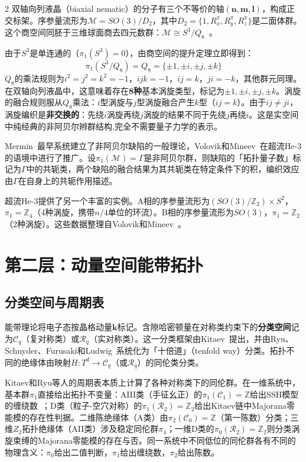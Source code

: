 \documentclass[a4paper,11pt]{ctexart}
\begin{document}
\begin{multicols}{2}
双轴向列液晶（biaxial nematic）的分子有三个不等价的轴$(\mathbf{n},\mathbf{m},\mathbf{l})$，构成正交标架。序参量流形为$\mathcal{M}=SO(3)/D_2$，其中$D_2=\{1,R_x^\pi,R_y^\pi,R_z^\pi\}$是二面体群。这个商空间同胚于三维球面商去四元数群：$\mathcal{M}\cong S^3/Q_8$~\cite{Mermin1979,Volovik1977}。

由于$S^3$是单连通的（$\pi_1(S^3)=0$），由商空间的提升定理立即得到：
\begin{equation}
\pi_1(S^3/Q_8)=Q_8=\{\pm1,\pm i,\pm j,\pm k\}
\end{equation}
$Q_8$的乘法规则为$i^2=j^2=k^2=-1$，$ijk=-1$，$ij=k$，$ji=-k$，其他群元同理。在双轴向列液晶中，这意味着存在\textbf{8种}基本涡旋类型，标记为$\pm1,\pm i,\pm j,\pm k$。涡旋的融合规则服从$Q_8$乘法：$i$型涡旋与$j$型涡旋融合产生$k$型（$ij=k$）。由于$ij\neq ji$，涡旋编织是\textbf{非交换的}：先绕$i$涡旋再绕$j$涡旋的结果不同于先绕$j$再绕$i$。这是实空间中纯经典的非阿贝尔辫群结构,完全不需要量子力学的表示。

Mermin~\cite{Mermin1979}最早系统建立了非阿贝尔缺陷的一般理论，Volovik和Mineev~\cite{Volovik1977}在超流He-3的语境中进行了推广。设$\pi_1(\mathcal{M})=\Gamma$是非阿贝尔群，则缺陷的「拓扑量子数」标记为$\Gamma$中的共轭类，两个缺陷的融合结果为其共轭类在特定条件下的积，编织效应由$\Gamma$在自身上的共轭作用描述。

超流He-3提供了另一个丰富的实例。A相的序参量流形为$(SO(3)/\mathbb{Z}_2)\times S^2$，$\pi_1=\mathbb{Z}_4$（4种涡旋，携带$n/4$单位的环流）。B相的序参量流形为$SO(3)$，$\pi_1=\mathbb{Z}_2$（2种涡旋）。这些数据整理自Volovik和Mineev~\cite{Volovik1977}。

\section{第二层：动量空间能带拓扑}

\subsection{分类空间与周期表}

能带理论将电子态按晶格动量$\mathbf{k}$标记。含隙哈密顿量在对称类约束下的\textbf{分类空间}记为$\mathcal{C}_q$（复对称类）或$\mathcal{R}_q$（实对称类）。这一分类框架由Kitaev~\cite{Kitaev2009}提出，并由Ryu、Schnyder、Furusaki和Ludwig~\cite{Ryu2010}系统化为「十倍道」（tenfold way）分类。拓扑不同的绝缘体由映射$H:T^d\to\mathcal{C}_q$（或$\mathcal{R}_q$）的同伦类分类。

Kitaev和Ryu等人的周期表本质上计算了各种对称类下的同伦群。在一维系统中，基本群$\pi_1$直接给出拓扑不变量：AIII类（手征幺正）的$\pi_1(\mathcal{C}_1)=\mathbb{Z}$给出SSH模型的缠绕数~\cite{SSH1979}；D类（粒子-空穴对称）的$\pi_1(\mathcal{R}_2)=\mathbb{Z}_2$给出Kitaev链中Majorana零能模的存在性判据。二维陈绝缘体（A类）由$\pi_2(\mathcal{C}_0)=\mathbb{Z}$（第一陈数）分类；三维$Z_2$拓扑绝缘体（AII类）涉及稳定同伦群$\pi_4$；一维D类的$\pi_0(\mathcal{R}_2)=\mathbb{Z}_2$则分类涡旋束缚的Majorana零能模的存在与否。同一系统中不同低位的同伦群各有不同的物理含义：$\pi_0$给出二值判断，$\pi_1$给出缠绕数，$\pi_2$给出陈数。


\end{multicols}
\end{document}

